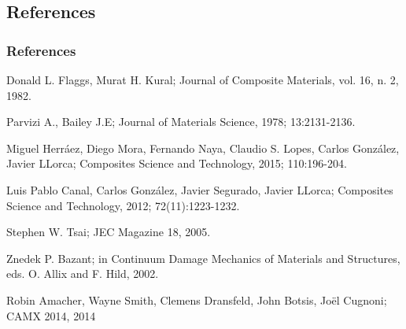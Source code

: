 \documentclass[first,firstsupp,lastsupp,handout,last,hyperref,table]{ETHclass}
\begin{document}
\subsection{References}

\begin{frame}[allowframebreaks]
  \frametitle{References}
    
  \begin{thebibliography}{10}
    
%
 
    
  \beamertemplatearticlebibitems

Donald L. Flaggs, Murat H. Kural;
\newblock Journal of Composite Materials, vol. 16, n. 2, 1982.

Parvizi A., Bailey J.E;
\newblock Journal of Materials Science, 1978; 13:2131-2136.

Miguel Herr\'aez, Diego Mora, Fernando Naya, Claudio S. Lopes, Carlos Gonz\'alez, Javier LLorca;
\newblock Composites Science and Technology, 2015; 110:196-204.

Luis Pablo Canal, Carlos Gonz\'alez, Javier Segurado, Javier LLorca;
\newblock Composites Science and Technology, 2012; 72(11):1223-1232.

Stephen W. Tsai;
\newblock JEC Magazine 18, 2005.


Znedek P. Bazant;
\newblock in Continuum Damage Mechanics of Materials and Structures, eds. O. Allix and F. Hild, 2002.


Robin Amacher, Wayne Smith, Clemens Dransfeld, John Botsis, Jo\"el Cugnoni;
\newblock CAMX 2014, 2014


\end{thebibliography}
\end{frame}
\end{document}
